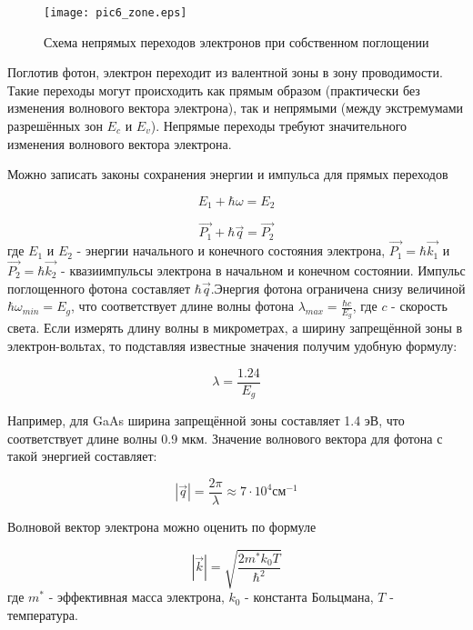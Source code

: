 \begin{figure}[h!]\centering
\texttt{[image: pic6\_zone.eps]}
\caption{Схема непрямых переходов электронов при собственном поглощении}
\label{pic6_zone}
\end{figure}

Поглотив фотон, электрон переходит из валентной зоны в зону проводимости. Такие переходы могут происходить как прямым образом (практически без изменения волнового вектора электрона), так и непрямыми (между экстремумами разрешённых зон $E_{c}$ и $E_{v}$). Непрямые переходы требуют значительного изменения волнового вектора электрона.

Можно записать законы сохранения энергии и импульса для прямых переходов

\begin{equation}
E_{1} + \hbar \omega = E_{2}
\end{equation}

\begin{equation}
\overrightarrow{P_{1}} + \hbar \overrightarrow{q} = \overrightarrow{P_{2}}
\end{equation}
где $E_{1}$ и $E_{2}$ - энергии начального и конечного состояния электрона, $\overrightarrow{P_{1}} = \hbar \overrightarrow{k_{1}}$ и $\overrightarrow{P_{2}} = \hbar \overrightarrow{k_{2}}$ - квазиимпульсы электрона в начальном и конечном состоянии. Импульс поглощенного фотона составляет $\hbar \overrightarrow{q}$.Энергия фотона ограничена снизу величиной $\hbar \omega_{min} = E_{g}$, что соответствует длине волны фотона $\lambda_{max} = \frac{\hbar c}{E_{g}}$, где $c$ - скорость света. Если измерять длину волны в микрометрах, а ширину запрещённой зоны в электрон-вольтах, то подставляя известные значения получим удобную формулу:

\begin{equation}
\lambda = \frac{1.24}{E_{g}}
\label{eq6_homega}
\end{equation}

Например, для GaAs ширина запрещённой зоны составляет 1.4 эВ, что соответствует длине волны 0.9 мкм. Значение волнового вектора для фотона с такой энергией составляет:

\begin{equation}
|\overrightarrow{q}| = \frac{2 \pi}{\lambda} \approx 7 \cdot 10^{4}  \text{см}^{-1}
\end{equation}

Волновой вектор электрона можно оценить по формуле

\begin{equation}
|\overrightarrow{k}| = \sqrt{\frac{2 m^{*} k_{0} T}{\hbar^{2}}}
\end{equation}
где $m^{*}$ - эффективная масса электрона, $k_{0}$ - константа Больцмана, $T$ - температура.

